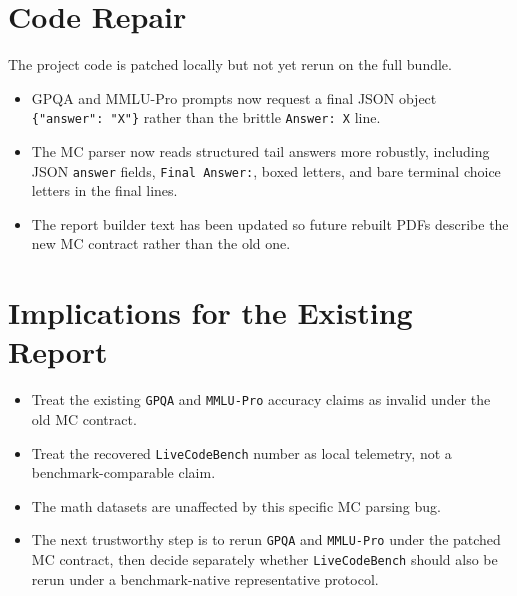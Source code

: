 \documentclass[11pt]{article}
\begin{document}
\section*{Code Repair}
The project code is patched locally but not yet rerun on the full bundle.
\begin{itemize}
\item GPQA and MMLU-Pro prompts now request a final JSON object
\texttt{\{"answer": "X"\}} rather than the brittle \texttt{Answer: X} line.
\item The MC parser now reads structured tail answers more robustly, including JSON
\texttt{answer} fields, \texttt{Final Answer:}, boxed letters, and bare terminal
choice letters in the final lines.
\item The report builder text has been updated so future rebuilt PDFs describe the new
MC contract rather than the old one.
\end{itemize}

\section*{Implications for the Existing Report}
\begin{itemize}
\item Treat the existing \texttt{GPQA} and \texttt{MMLU-Pro} accuracy claims as
invalid under the old MC contract.
\item Treat the recovered \texttt{LiveCodeBench} number as local telemetry, not a
benchmark-comparable claim.
\item The math datasets are unaffected by this specific MC parsing bug.
\item The next trustworthy step is to rerun \texttt{GPQA} and \texttt{MMLU-Pro} under
the patched MC contract, then decide separately whether \texttt{LiveCodeBench} should
also be rerun under a benchmark-native representative protocol.
\end{itemize}
\end{document}
